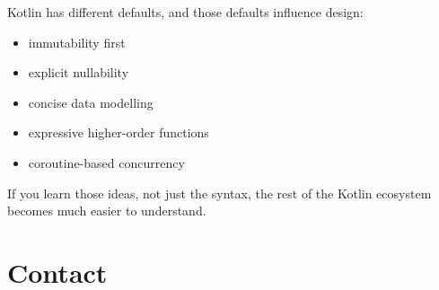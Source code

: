 \documentclass[11pt,a4paper]{article}
\begin{document}
Kotlin has different defaults, and those defaults influence design:
\begin{itemize}
    \item immutability first
    \item explicit nullability
    \item concise data modelling
    \item expressive higher-order functions
    \item coroutine-based concurrency
\end{itemize}

If you learn those ideas, not just the syntax, the rest of the Kotlin ecosystem becomes much easier to understand.

\section{Contact}

\KazeContactBlock
\end{document}
